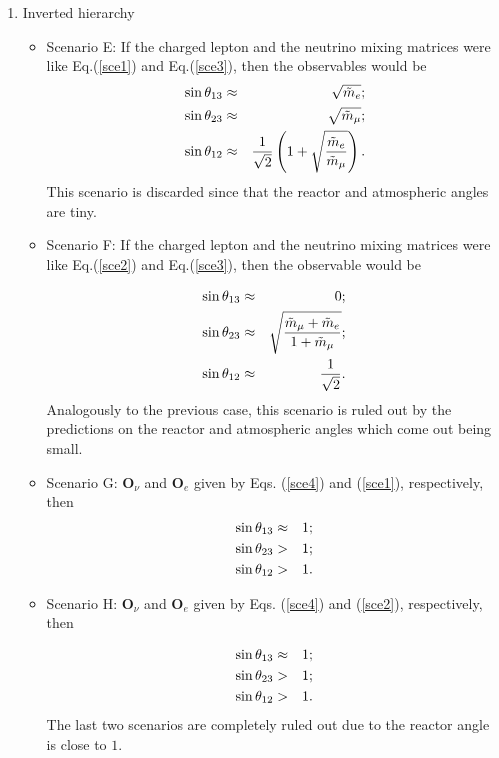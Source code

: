 \documentclass[aps,prd,groupaddress,floatfix,tighten,nofootinbib,showpacs,amsfonts,superscriptaddress]{revtex4-2}
\begin{document}
\begin{enumerate}
\item Inverted hierarchy

\begin{itemize}
	\item Scenario E: If the charged lepton and the neutrino mixing matrices were like Eq.(\ref{sce1}) and  Eq.(\ref{sce3}), then the observables would be
	\begin{eqnarray}
	\sin{\theta_{13}}&\approx&  \sqrt{\tilde{m}_{e}};\notag\\
	\sin{\theta_{23}}&\approx& \sqrt{\tilde{m}_{\mu}};\notag\\
	\sin{\theta_{12}}&\approx&  \frac{1}{\sqrt{2}}\left(1+\sqrt{\frac{\tilde{m}_{e}}{\tilde{m}_{\mu}}}\right).
	\end{eqnarray}
This scenario is discarded since that the reactor and atmospheric angles are tiny.	
	
\item Scenario F: If the charged lepton  and the neutrino mixing matrices were like Eq.(\ref{sce2}) and  Eq.(\ref{sce3}), then  the observable would be
	
	\begin{eqnarray}
	\sin{\theta_{13}}&\approx& 0;\notag\\
	\sin{\theta_{23}}&\approx& \sqrt{\frac{\tilde{m}_{\mu}+\tilde{m}_{e}}{1+\tilde{m}_{\mu}}};\notag\\
	\sin{\theta_{12}}&\approx&  \frac{1}{\sqrt{2}}.
	\end{eqnarray}
Analogously to the previous case, this scenario is ruled out by the predictions on the reactor and atmospheric angles which come out being small.	

\item Scenario G: $\mathbf{O}_{\nu}$ and $\mathbf{O}_{e}$ given by  Eqs. (\ref{sce4}) and (\ref{sce1}), respectively, then
\begin{eqnarray}
\sin{\theta_{13}}&\approx& 1;\notag\\
\sin{\theta_{23}}&>&1 ;\notag\\
\sin{\theta_{12}}&>&1.
\end{eqnarray}	

\item Scenario H: $\mathbf{O}_{\nu}$ and $\mathbf{O}_{e}$ given by  Eqs. (\ref{sce4}) and (\ref{sce2}), respectively, then

\begin{eqnarray}
\sin{\theta_{13}}&\approx& 1;\notag\\
\sin{\theta_{23}}&>& 1;\notag\\
\sin{\theta_{12}}&>& 1.
\end{eqnarray}	
The last two scenarios are completely ruled out due to the reactor angle is close to $1$.
\end{itemize}
\end{enumerate}
\end{document}
